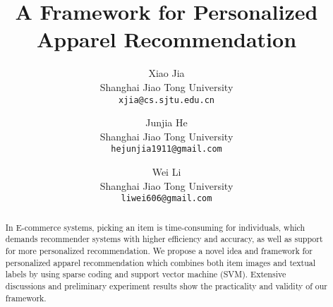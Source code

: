 \documentclass[a4paper]{article}
\title{A Framework for Personalized Apparel Recommendation}
\author{
Xiao Jia\\
        \small Shanghai Jiao Tong University\\
        \small \texttt{xjia@cs.sjtu.edu.cn}\\
\and
Junjia He\\
        \small Shanghai Jiao Tong University\\
        \small \texttt{hejunjia1911@gmail.com}\\
\and
Wei Li\\
        \small Shanghai Jiao Tong University\\
        \small \texttt{liwei606@gmail.com}\\
}
\date{}
\begin{document}
\maketitle

\begin{abstract}
In E-commerce systems, picking an item is time-consuming for individuals, which demands recommender systems with higher efficiency and accuracy, as well as support for more personalized recommendation. We propose a novel idea and framework for personalized apparel recommendation which combines both item images and textual labels by using sparse coding and support vector machine (SVM). Extensive discussions and preliminary experiment results show the practicality and validity of our framework.
\end{abstract}











\end{document}
